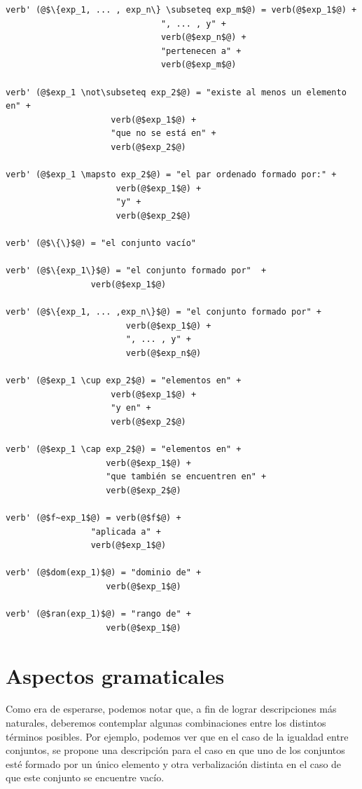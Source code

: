 \begin{mdframed}[style=codebox]
\begin{verbatim}
verb' (@$\{exp_1, ... , exp_n\} \subseteq exp_m$@) = verb(@$exp_1$@) +  
                               ", ... , y" +  
                               verb(@$exp_n$@) +  
                               "pertenecen a" +
                               verb(@$exp_m$@)

verb' (@$exp_1 \not\subseteq exp_2$@) = "existe al menos un elemento en" +  
                     verb(@$exp_1$@) +  
                     "que no se está en" +  
                     verb(@$exp_2$@) 

verb' (@$exp_1 \mapsto exp_2$@) = "el par ordenado formado por:" +  
                      verb(@$exp_1$@) +  
                      "y" +  
                      verb(@$exp_2$@) 

verb' (@$\{\}$@) = "el conjunto vacío" 

verb' (@$\{exp_1\}$@) = "el conjunto formado por"  +  
                 verb(@$exp_1$@) 

verb' (@$\{exp_1, ... ,exp_n\}$@) = "el conjunto formado por" +  
                        verb(@$exp_1$@) +  
                        ", ... , y" +  
                        verb(@$exp_n$@) 

verb' (@$exp_1 \cup exp_2$@) = "elementos en" +  
                     verb(@$exp_1$@) +  
                     "y en" +  
                     verb(@$exp_2$@) 

verb' (@$exp_1 \cap exp_2$@) = "elementos en" +  
                    verb(@$exp_1$@) +  
                    "que también se encuentren en" +  
                    verb(@$exp_2$@) 

verb' (@$f~exp_1$@) = verb(@$f$@) +  
                 "aplicada a" +  
                 verb(@$exp_1$@) 

verb' (@$dom(exp_1)$@) = "dominio de" +  
                    verb(@$exp_1$@) 

verb' (@$ran(exp_1)$@) = "rango de" +  
                    verb(@$exp_1$@)  
\end{verbatim}
\end{mdframed}


\section{Aspectos gramaticales}
\label{sec:corpus_gramatica}

Como era de esperarse, podemos notar que, a fin de lograr descripciones más naturales, deberemos contemplar algunas combinaciones entre los distintos términos posibles. Por ejemplo, podemos ver que en el caso de la igualdad entre conjuntos, se propone una descripción para el caso en que uno de los conjuntos esté formado por un único elemento y otra verbalización distinta en el caso de que este conjunto se encuentre vacío.

